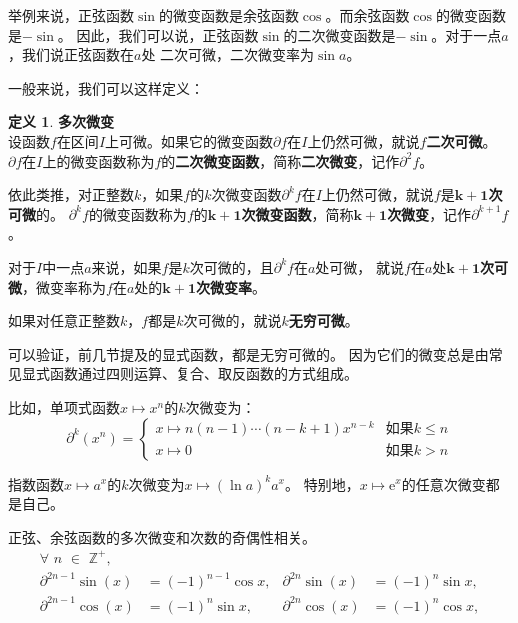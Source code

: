 \documentclass[12pt,UTF8]{ctexbook}
\theoremstyle{definition}
\newtheorem{df}{定义}[section]
\theoremstyle{plain}
\begin{document}
举例来说，正弦函数$\sin$的微变函数是余弦函数$\cos$。而余弦函数$\cos$的微变函数是$-\sin$。
因此，我们可以说，正弦函数$\sin$的二次微变函数是$-\sin$。对于一点$a$，我们说正弦函数在$a$处
二次可微，二次微变率为$\sin{a}$。

一般来说，我们可以这样定义：
\begin{df}{\textbf{多次微变}}
    \mbox{} \\
    设函数$f$在区间$I$上可微。如果它的微变函数$\partial f$在$I$上仍然可微，就说$f$\textbf{二次可微}。
    $\partial f$在$I$上的微变函数称为$f$的\textbf{二次微变函数}，简称\textbf{二次微变}，记作$\partial^2 f$。
    
    依此类推，对正整数$k$，如果$f$的$k$次微变函数$\partial^k f$在$I$上仍然可微，就说$f$是$\boldsymbol{k+1}$\textbf{次可微}的。
    $\partial^k f$的微变函数称为$f$的$\boldsymbol{k+1}$\textbf{次微变函数}，简称$\boldsymbol{k+1}$\textbf{次微变}，记作$\partial^{k+1} f$。

    对于$I$中一点$a$来说，如果$f$是$k$次可微的，且$\partial^k f$在$a$处可微，
    就说$f$在$a$处$\boldsymbol{k+1}$\textbf{次可微}，微变率称为$f$在$a$处的$\boldsymbol{k+1}$\textbf{次微变率}。

    如果对任意正整数$k$，$f$都是$k$次可微的，就说$k$\textbf{无穷可微}。
\end{df}

可以验证，前几节提及的显式函数，都是无穷可微的。
因为它们的微变总是由常见显式函数通过四则运算、复合、取反函数的方式组成。

比如，单项式函数$x\mapsto x^n$的$k$次微变为：
$$ \partial^k (x^n) = \left\{
    \begin{array}{ll}
        x\mapsto n(n-1)\cdots(n-k+1) x^{n-k} & \mbox{如果} k \leqslant n \\
        x\mapsto 0 & \mbox{如果} k > n
    \end{array}\right.
$$

指数函数$x\mapsto a^x$的$k$次微变为$x\mapsto (\ln{a})^k a^x$。
特别地，$x\mapsto \mathrm{e}^x$的任意次微变都是自己。

正弦、余弦函数的多次微变和次数的奇偶性相关。
\begin{align*}
    \forall \,\,n\,\,\in\,\,\mathbb{Z}^+, \\
    \partial^{2n-1} \sin(x) &= (-1)^{n-1} \cos{x}, & \partial^{2n} \sin(x) &= (-1)^{n} \sin{x},  \\
    \partial^{2n-1} \cos(x) &= (-1)^{n} \sin{x}, & \partial^{2n} \cos(x) &= (-1)^{n} \cos{x},  
\end{align*}
\end{document}
